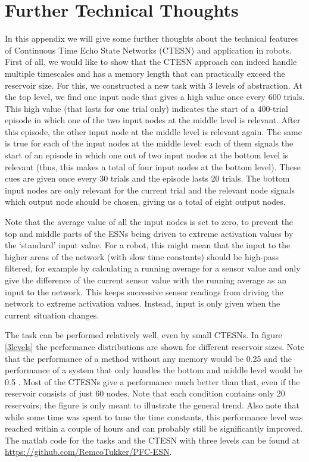 \documentclass[10pt,a4paper]{report}
\begin{document}


\appendix
\chapter{Further Technical Thoughts}

In this appendix we will give some further thoughts about the technical features of Continuous Time Echo State Networks (CTESN) and application in robots. First of all, we would like to show that the CTESN approach can indeed handle multiple timescales and has a memory length that can practically exceed the reservoir size. For this, we constructed a new task with 3 levels of abstraction. At the top level, we find one input node that gives a high value once every 600 trials. This high value (that lasts for one trial only) indicates the start of a 400-trial episode in which one of the two input nodes at the middle level is relevant. After this episode, the other input node at the middle level is relevant again. The same is true for each of the input nodes at the middle level: each of them signals the start of an episode in which one out of two input nodes at the bottom level is relevant (thus, this makes a total of four input nodes at the bottom level). These cues are given once every 30 trials and the episode lasts 20 trials. The bottom input nodes are only relevant for the current trial and the relevant node signals which output node should be chosen, giving us a total of eight output nodes. 

Note that the average value of all the input nodes is set to zero, to prevent the top and middle parts of the ESNs being driven to extreme activation values by the `standard' input value. For a robot, this might mean that the input to the higher areas of the network (with slow time constants) should be high-pass filtered, for example by calculating a running average for a sensor value and only give the difference of the current sensor value with the running average as an input to the network. This keeps successive sensor readings from driving the network to extreme activation values. Instead, input is only given when the current situation changes.

The task can be performed relatively well, even by small CTESNs. In figure \ref{3levels} the performance distributions are shown for different reservoir sizes. Note that the performance of a method without any memory would be 0.25 and the performance of a system that only handles the bottom and middle level would be 0.5 . Most of the CTESNs give a performance much better than that, even if the reservoir consists of just 60 nodes. Note that each condition contains only 20 reservoirs; the figure is only meant to illustrate the general trend. Also note that while some time was spent to tune the time constants, this performance level was reached within a couple of hours and can probably still be significantly improved. The matlab code for the tasks and the CTESN with three levels can be found at \url{https://github.com/RemcoTukker/PFC-ESN}.
\end{document}
